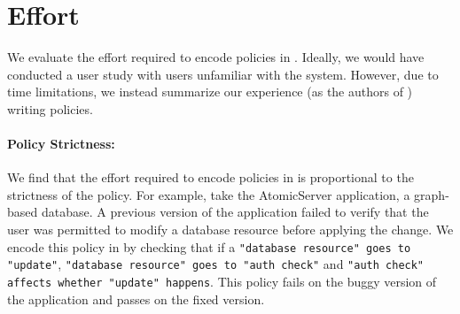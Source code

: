 \section{Effort}
\label{sec:accessibility}

We evaluate the effort required to encode policies in \syslang{}.
%
Ideally, we would have conducted a user study with users unfamiliar with the system.
%
However, due to time limitations, we instead summarize our experience (as the authors of \syslang{}) writing policies.
%

\paragraph{Policy Strictness:} We find that the effort required to encode policies in \syslang{} is proportional to the strictness of the policy.
%
For example, take the AtomicServer application, a graph-based database.
%
A previous version of the application failed to verify that the 
user was permitted to modify a database resource before applying the change.
%
%
%
We encode this policy in \syslang{} by checking that if a \lstinline[language=CNL]|"database resource" goes to "update"|,
\lstinline[language=CNL]|"database resource" goes to "auth check"| and 
\lstinline[language=CNL]|"auth check" affects whether "update" happens|.
%
This policy fails on the buggy version of the application and passes on the fixed version.

